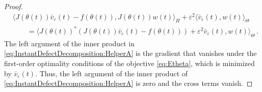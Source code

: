 \documentclass[oneside,11pt]{article}
\theoremstyle{remark}
\theoremstyle{thmstyleone}
\theoremstyle{thmstylethree}
\theoremstyle{thmstyletwo}
\begin{document}
\begin{proof}
\begin{equation}
          \begin{aligned}
          &\langle J(\theta(t))\bar{v}_{\varepsilon}(t) - f(\theta(t)), J(\theta(t))w(t)\rangle_H + \varepsilon^2\langle \bar{v}_{\varepsilon}(t), w(t)\rangle_{\Theta}\\
          &\qquad = \langle J(\theta(t))^*(J(\theta(t))\bar{v}_{\varepsilon}(t) - f(\theta(t))) + \varepsilon^2\bar{v}_{\varepsilon}(t), w(t)\rangle_{\Theta}\,.
          \end{aligned}
          \end{equation}
          The left argument of the inner product in \eqref{eq:InstantDefectDecomposition:HelperA} is the gradient that vanishes under the first-order optimality conditions of the objective \eqref{eq:Etheta}, which is minimized by 
         $\bar{v}_{\varepsilon}(t)$. Thus, the left argument of the inner product of \eqref{eq:InstantDefectDecomposition:HelperA} is zero and the cross terms vanish.
        \end{proof}
\end{document}
